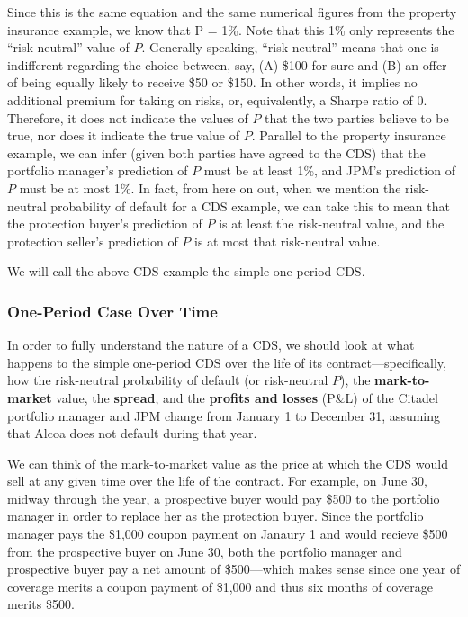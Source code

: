 \documentclass{jss}
\begin{document}
Since this is the same equation and the same numerical figures from the property insurance example, we know that P = 1\%. Note that this 1\% only represents the ``risk-neutral'' value of $P$. Generally speaking, ``risk neutral'' means that one is indifferent regarding the choice between, say, (A) \$100 for sure and (B) an offer of being equally likely to receive \$50 or \$150. In other words, it implies no additional premium for taking on risks, or, equivalently, a Sharpe ratio of $0$. Therefore, it does not indicate the values of $P$ that the two parties believe to be true, nor does it indicate the true value of $P$. Parallel to the property insurance example, we can infer (given both parties have agreed to the CDS) that the portfolio manager's prediction of $P$ must be at least 1\%, and JPM's prediction of $P$ must be at most 1\%. In fact, from here on out, when we mention the risk-neutral probability of default for a CDS example, we can take this to mean that the protection buyer's prediction of $P$ is at least the risk-neutral value, and the protection seller's prediction of $P$ is at most that risk-neutral value.

We will call the above CDS example the simple one-period CDS.

\subsubsection{One-Period Case Over Time}
\label{sec:OnePeriodOverTime}

In order to fully understand the nature of a CDS, we should look at what happens to the simple one-period CDS over the life of its contract---specifically, how the risk-neutral probability of default (or risk-neutral $P$), the \textbf{mark-to-market} value, the \textbf{spread}, and the \textbf{profits and losses} (P\&L) of the Citadel portfolio manager and JPM change from January 1 to December 31, assuming that Alcoa does not default during that year.

We can think of the mark-to-market value as the price at which the CDS would sell at any given time over the life of the contract. For example, on June 30, midway through the year, a prospective buyer would pay \$500 to the portfolio manager in order to replace her as the protection buyer. Since the portfolio manager pays the \$1,000 coupon payment on Janaury 1 and would recieve \$500 from the prospective buyer on June 30, both the portfolio manager and prospective buyer pay a net amount of \$500---which makes sense since one year of coverage merits a coupon payment of \$1,000 and thus six months of coverage merits \$500. 
\end{document}
